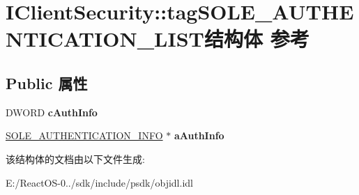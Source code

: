 \hypertarget{struct_i_client_security_1_1tag_s_o_l_e___a_u_t_h_e_n_t_i_c_a_t_i_o_n___l_i_s_t}{}\section{I\+Client\+Security\+:\+:tag\+S\+O\+L\+E\+\_\+\+A\+U\+T\+H\+E\+N\+T\+I\+C\+A\+T\+I\+O\+N\+\_\+\+L\+I\+S\+T结构体 参考}
\label{struct_i_client_security_1_1tag_s_o_l_e___a_u_t_h_e_n_t_i_c_a_t_i_o_n___l_i_s_t}
\subsection*{Public 属性}
\begin{DoxyCompactItemize}
\item 
\mbox{\label{struct_i_client_security_1_1tag_s_o_l_e___a_u_t_h_e_n_t_i_c_a_t_i_o_n___l_i_s_t_aae13f0bafa824babc45cf62edc383b77}} 
D\+W\+O\+RD {\bfseries c\+Auth\+Info}
\item 
\mbox{\label{struct_i_client_security_1_1tag_s_o_l_e___a_u_t_h_e_n_t_i_c_a_t_i_o_n___l_i_s_t_ad122b7e8b4d6aa29a95bafb8ce966fa1}} 
\hyperlink{struct_i_client_security_1_1tag_s_o_l_e___a_u_t_h_e_n_t_i_c_a_t_i_o_n___i_n_f_o}{S\+O\+L\+E\+\_\+\+A\+U\+T\+H\+E\+N\+T\+I\+C\+A\+T\+I\+O\+N\+\_\+\+I\+N\+FO} $\ast$ {\bfseries a\+Auth\+Info}
\end{DoxyCompactItemize}


该结构体的文档由以下文件生成\+:\begin{DoxyCompactItemize}
\item 
E\+:/\+React\+O\+S-\/0../sdk/include/psdk/objidl.\+idl\end{DoxyCompactItemize}
